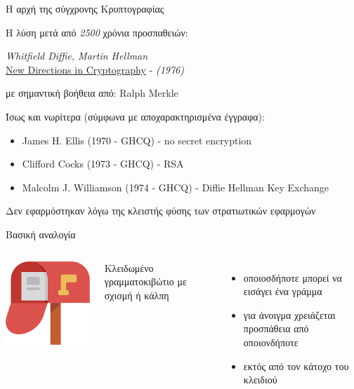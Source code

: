 \documentclass[handout]{beamer}
\begin{document}
\begin{frame}{Η αρχή της σύγχρονης Κρυπτογραφίας}

Η λύση μετά από \emph{2500} χρόνια προσπαθειών:  

\emph{Whitfield Diffie, Martin Hellman}\\ \href{http://www-ee.stanford.edu/~hellman/publications/24.pdf}{New Directions in Cryptography} - \emph{(1976)}

με σημαντική βοήθεια από: Ralph Merkle
\pause

Ίσως και νωρίτερα (σύμφωνα με αποχαρακτηρισμένα έγγραφα):
\begin{itemize}
	\item James H. Ellis (1970 - GHCQ) - no secret encryption 
	\item Clifford Cocks (1973 - GHCQ) - RSA
	\item Malcolm J. Williamson (1974 - GHCQ) - Diffie Hellman Key Exchange
\end{itemize}
\pause
Δεν εφαρμόστηκαν λόγω της κλειστής φύσης των στρατιωτικών εφαρμογών
\end{frame}

\begin{frame}{Βασική αναλογία}
\begin{columns}
\includegraphics[scale=0.3]{mailbox.png}


Κλειδωμένο γραμματοκιβώτιο με σχισμή ή κάλπη
\pause
\begin{itemize}
	\item οποιοσδήποτε μπορεί να εισάγει ένα γράμμα \pause
	\item για άνοιγμα χρειάζεται προσπάθεια από οποιονδήποτε \pause
	\item εκτός από τον κάτοχο του κλειδιού
\end{itemize} 


\end{columns}

\end{frame}
\end{document}
